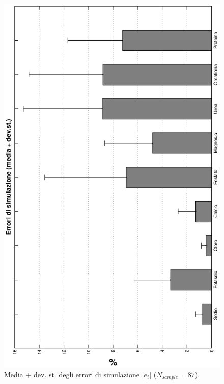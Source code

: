 \begin{figure}[!h]
\centering
		\includegraphics[angle=-90, width=\textwidth]{immagini/err_sim.eps}
				\caption{Media + dev. st. degli errori di simulazione $|e_i|$ ($N_{sample}=87$).}\label{fig:err_pred}
\end{figure}

